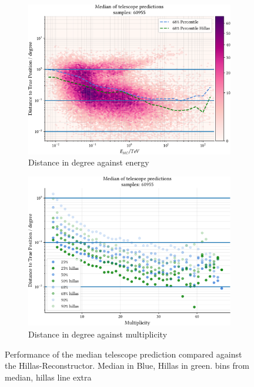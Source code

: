 \begin{figure}
    \centering
    \begin{subfigure}{0.45\textwidth}
        \includegraphics[width=0.9\linewidth]{../analysis/plots/gamma/median_vs_energy.pdf} 
        \caption{Distance in degree against energy}
    \end{subfigure}
    \begin{subfigure}{0.45\textwidth}
        \includegraphics[width=0.9\linewidth]{../analysis/plots/gamma/median_vs_multi_comp.pdf}
        \caption{Distance in degree against multiplicity}
    \end{subfigure}
    \caption{Performance of the median telescope prediction compared 
    against the Hillas-Reconstructor. Median in Blue, Hillas in green. bins from median, hillas
    line extra}
    \label{fig:stereo_double_median}
\end{figure}


